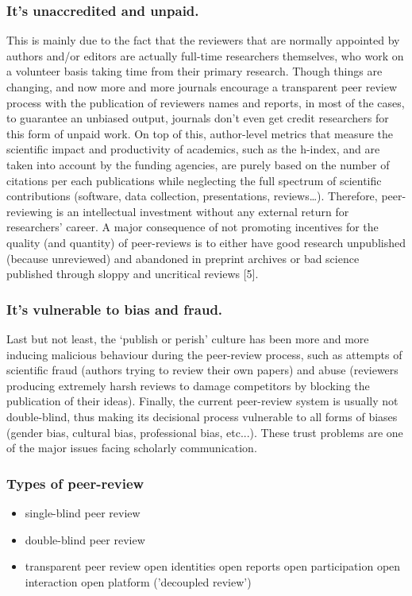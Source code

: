 \documentclass[runningheads]{llncs}
\begin{document}
\subsubsection{It's unaccredited and unpaid.} This is mainly due to the fact that the reviewers that are normally appointed by authors and/or editors are actually full-time researchers themselves, who work on a volunteer basis taking time from their primary research. Though things are changing, and now more and more journals encourage a transparent peer review process with the publication of reviewers names and reports, in most of the cases, to guarantee an unbiased output, journals don’t even get credit researchers for this form of unpaid work. On top of this, author-level metrics that measure the scientific impact and productivity of academics, such as the h-index, and are taken into account by the funding agencies, are purely based on the number of citations per each publications while neglecting the full spectrum of scientific contributions (software, data collection, presentations, reviews…). Therefore, peer-reviewing is an intellectual investment without any external return for researchers’ career. A major consequence of not promoting incentives for the quality (and quantity) of peer-reviews is to either have good research unpublished (because unreviewed) and abandoned in preprint archives or bad science published through sloppy and uncritical reviews [5].
\subsubsection{It's vulnerable to bias and fraud.} Last but not least, the ‘publish or perish’ culture has been more and more inducing malicious behaviour during the peer-review process, such as attempts of scientific fraud (authors trying to review their own papers) and abuse (reviewers producing extremely harsh reviews to damage competitors by blocking the publication of their ideas). Finally, the current peer-review system is usually not double-blind, thus making its decisional process vulnerable to all forms of biases (gender bias, cultural bias, professional bias, etc...). These trust problems are one of the major issues facing scholarly communication.

\subsubsection{Types of peer-review}
\begin{itemize}
    \item single-blind peer review
    \item double-blind peer review
    \item transparent peer review
    open identities open reports open participation open interaction open platform ('decoupled review')
\end{itemize}
\end{document}
